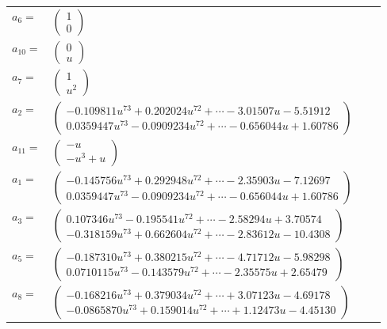 \documentclass[1p]{elsarticle_modified}
\theoremstyle{definition}
\begin{document}
\begin{tabular}{m{7pt} m{180pt} m{7pt} m{180pt} }
\flushright $a_{6}=$&$\begin{pmatrix}1\\0\end{pmatrix}$ \\
\flushright $a_{10}=$&$\begin{pmatrix}0\\u\end{pmatrix}$ \\
\flushright $a_{7}=$&$\begin{pmatrix}1\\u^2\end{pmatrix}$ \\
\flushright $a_{2}=$&$\begin{pmatrix}-0.109811 u^{73}+0.202024 u^{72}+\cdots-3.01507 u-5.51912\\0.0359447 u^{73}-0.0909234 u^{72}+\cdots-0.656044 u+1.60786\end{pmatrix}$ \\
\flushright $a_{11}=$&$\begin{pmatrix}- u\\- u^3+u\end{pmatrix}$ \\
\flushright $a_{1}=$&$\begin{pmatrix}-0.145756 u^{73}+0.292948 u^{72}+\cdots-2.35903 u-7.12697\\0.0359447 u^{73}-0.0909234 u^{72}+\cdots-0.656044 u+1.60786\end{pmatrix}$ \\
\flushright $a_{3}=$&$\begin{pmatrix}0.107346 u^{73}-0.195541 u^{72}+\cdots-2.58294 u+3.70574\\-0.318159 u^{73}+0.662604 u^{72}+\cdots-2.83612 u-10.4308\end{pmatrix}$ \\
\flushright $a_{5}=$&$\begin{pmatrix}-0.187310 u^{73}+0.380215 u^{72}+\cdots-4.71712 u-5.98298\\0.0710115 u^{73}-0.143579 u^{72}+\cdots-2.35575 u+2.65479\end{pmatrix}$ \\
\flushright $a_{8}=$&$\begin{pmatrix}-0.168216 u^{73}+0.379034 u^{72}+\cdots+3.07123 u-4.69178\\-0.0865870 u^{73}+0.159014 u^{72}+\cdots+1.12473 u-4.45130\end{pmatrix}$ \\

\end{tabular}
\end{document}
